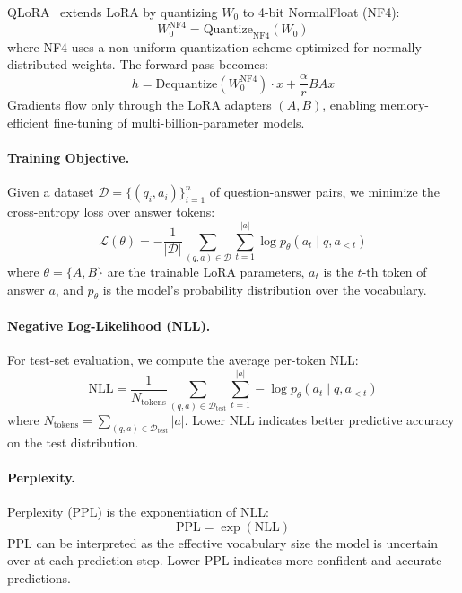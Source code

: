 \documentclass[twocolumn]{article}
\begin{document}
QLoRA~\cite{dettmers2023qlora} extends LoRA by quantizing $W_0$ to 4-bit NormalFloat (NF4):
\begin{equation}
W_0^{\text{NF4}} = \text{Quantize}_{\text{NF4}}(W_0)
\end{equation}
where NF4 uses a non-uniform quantization scheme optimized for normally-distributed weights.
The forward pass becomes:
\begin{equation}
h = \text{Dequantize}(W_0^{\text{NF4}}) \cdot x + \frac{\alpha}{r} B A x
\end{equation}
Gradients flow only through the LoRA adapters $(A, B)$, enabling memory-efficient 
fine-tuning of multi-billion-parameter models.

\paragraph{Training Objective.}
Given a dataset $\mathcal{D} = \{(q_i, a_i)\}_{i=1}^n$ of question-answer pairs,
we minimize the cross-entropy loss over answer tokens:
\begin{equation}
\mathcal{L}(\theta) = -\frac{1}{|\mathcal{D}|} \sum_{(q,a) \in \mathcal{D}} 
\sum_{t=1}^{|a|} \log p_\theta(a_t \mid q, a_{<t})
\label{eq:loss}
\end{equation}
where $\theta = \{A, B\}$ are the trainable LoRA parameters, $a_t$ is the $t$-th token
of answer $a$, and $p_\theta$ is the model's probability distribution over the vocabulary.

\paragraph{Negative Log-Likelihood (NLL).}
For test-set evaluation, we compute the average per-token NLL:
\begin{equation}
\text{NLL} = \frac{1}{N_{\text{tokens}}} \sum_{(q,a) \in \mathcal{D}_{\text{test}}} 
\sum_{t=1}^{|a|} -\log p_\theta(a_t \mid q, a_{<t})
\label{eq:nll}
\end{equation}
where $N_{\text{tokens}} = \sum_{(q,a) \in \mathcal{D}_{\text{test}}} |a|$.
Lower NLL indicates better predictive accuracy on the test distribution.

\paragraph{Perplexity.}
Perplexity (PPL) is the exponentiation of NLL:
\begin{equation}
\text{PPL} = \exp(\text{NLL})
\label{eq:ppl}
\end{equation}
PPL can be interpreted as the effective vocabulary size the model is uncertain over
at each prediction step. Lower PPL indicates more confident and accurate predictions.
\end{document}
